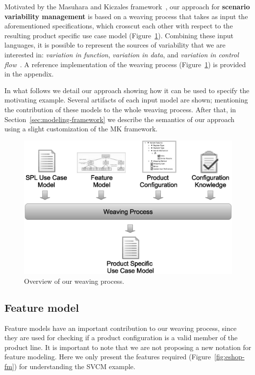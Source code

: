 \documentclass{acm_proc_article-sp}
\begin{document}
Motivated by the Masuhara and Kiczales
framework~\cite{Masuhara:2003aa}, our approach for \textbf{scenario variability
management} is based on a weaving process that takes as input the aforementioned
specifications, which crosscut each other with respect to the resulting product
specific use case model (Figure~\ref{fig:weave-process}). Combining these input
languages, it is possible to represent the sources of variability that we are
interested in: \emph{variation in function}, \emph{variation in data}, and
\emph{variation in control flow}~\cite{Bachmann:2001aa}. A reference implementation of the weaving process (Figure~\ref{fig:weave-process}) is provided in the appendix.

In what follows we detail our approach showing how it
can be used to specify the motivating example. Several artifacts of each input model
are shown; mentioning the contribution of these models to the whole weaving
process. After that, in Section~\ref{sec:modeling-framework} we describe the semantics of our approach using a slight customization of the MK framework.

\begin{figure}[htb]
 \begin{center}
  \includegraphics[scale=0.30]{img/weave-process2.eps}
  \caption{Overview of our weaving process.}
  \label{fig:weave-process}
  \end{center}
\end{figure}

\subsection{Feature model}

Feature models have an important contribution to our
weaving process, since they are used for checking if a product
configuration is a valid member of the product line. It is important to note
that we are not proposing a new notation for feature modeling. Here we
only present the features required (Figure~\ref{fig:eshop-fm}) for
understanding the SVCM example.
\end{document}
